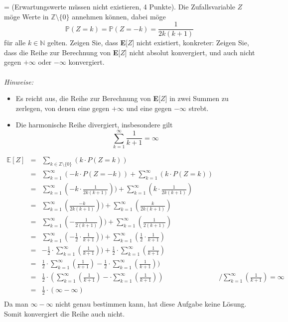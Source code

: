 \documentclass[twoside]{article}
\begin{document}
\ifnum\ZettelSieben=\True
{}
(Erwartungswerte müssen nicht existieren, 4 Punkte).
Die Zufallsvariable $Z$ möge Werte in $\mathbb{Z} \setminus \{0\}$ annehmen können, dabei möge
\[
	\mathbb{P}(Z=k) = \mathbb{P}(Z=-k) = \frac{1}{2k(k+1)}
\]
für alle $k \in \mathbb{N}$ gelten.
Zeigen Sie, dass \textbf{E}[$Z$] nicht existiert, konkreter:
Zeigen Sie, dass die Reihe zur Berechnung von \textbf{E}[$Z$] nicht absolut konvergiert, und auch nicht gegen $+\infty$ oder $-\infty$ konvergiert.\\
\vspace{-.2cm}\\
\textit{Hinweise:}
\begin{itemize}
	\item Es reicht aus, die Reihe zur Berechnung von \textbf{E}[$Z$] in zwei Summen zu zerlegen, von denen eine gegen $+\infty$ und eine gegen $-\infty$ strebt.
	\item Die harmonische Reihe divergiert, insbesondere gilt
	\[
		\sum_{k=1}^{\infty} \frac{1}{k+1}=\infty
	\]
\end{itemize}
\vspace{.4cm}
\begin{equation*}
	\begin{array}{rlll}
		\mathbb{E}[Z]&=    &\sum_{k \in \mathbb{Z}\setminus\{0\}}(k \cdot P(Z = k))&\\
		    &=    &\sum_{k = 1}^{\infty}(-k \cdot P(Z = -k)) + \sum_{k=1}^{\infty}(k \cdot P(Z = k))&\\
		    &=    &\sum_{k = 1}^{\infty}(-k \cdot \frac{1}{2k(k+1)})) + \sum_{k=1}^{\infty}(k \cdot \frac{1}{2k(k+1)})&\\
		    &=    &\sum_{k = 1}^{\infty}(\frac{-k}{2k(k+1)})) + \sum_{k=1}^{\infty}(\frac{k}{2k(k+1)})&\\
		    &=    &\sum_{k = 1}^{\infty}(-\frac{1}{2(k+1)})) + \sum_{k=1}^{\infty}(\frac{1}{2(k+1)})&\\
		    &=    &\sum_{k = 1}^{\infty}(-\frac{1}{2}\cdot\frac{1}{k+1})) + \sum_{k=1}^{\infty}(\frac{1}{2}\cdot\frac{1}{k+1})&\\
		    &=    &-\frac{1}{2}\cdot\sum_{k = 1}^{\infty}(\frac{1}{k+1})) + \frac{1}{2}\cdot\sum_{k=1}^{\infty}(\frac{1}{k+1})&\\
		    &=    &\frac{1}{2}\cdot\sum_{k=1}^{\infty}(\frac{1}{k+1}) - \frac{1}{2}\cdot\sum_{k = 1}^{\infty}(\frac{1}{k+1}))&\\
		    &=    &\frac{1}{2}\cdot\left(\sum_{k=1}^{\infty}(\frac{1}{k+1}) - \cdot\sum_{k = 1}^{\infty}(\frac{1}{k+1})\right)& /\sum_{k=1}^{\infty}(\frac{1}{k+1})=\infty\\
		    &=    &\frac{1}{2}\cdot\left(\infty - \infty\right)&\\
	\end{array}
\end{equation*}
Da man $\infty - \infty$ nicht genau bestimmen kann, hat diese Aufgabe keine Lösung.
Somit konvergiert die Reihe auch nicht.
\end{document}
